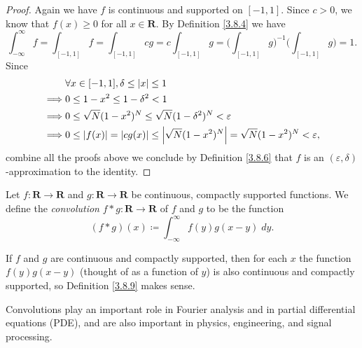 \begin{proof}
    Again we have \(f\) is continuous and supported on \([-1, 1]\).
    Since \(c > 0\), we know that \(f(x) \geq 0\) for all \(x \in \mathbf{R}\).
    By Definition \ref{3.8.4} we have
    \[
        \int_{-\infty}^\infty f = \int_{[-1, 1]} f = \int_{[-1, 1]} cg = c \int_{[-1, 1]} g = \bigg(\int_{[-1, 1]} g\bigg)^{-1} \bigg(\int_{[-1, 1]} g\bigg) = 1.
    \]
    Since
    \begin{align*}
                 & \forall x \in [-1, 1], \delta \leq \abs*{x} \leq 1                                                       \\
        \implies & 0 \leq 1 - x^2 \leq 1 - \delta^2 < 1                                                                     \\
        \implies & 0 \leq \sqrt{N} (1 - x^2)^N \leq \sqrt{N} (1 - \delta^2)^N < \varepsilon                                 \\
        \implies & 0 \leq \abs*{f(x)} = \abs*{cg(x)} \leq \abs*{\sqrt{N} (1 - x^2)^N} = \sqrt{N} (1 - x^2)^N < \varepsilon,
    \end{align*}
    combine all the proofs above we conclude by Definition \ref{3.8.6} that \(f\) is an \((\varepsilon, \delta)\)-approximation to the identity.
\end{proof}

\begin{definition}[Convolution]\label{3.8.9}
    Let \(f : \mathbf{R} \to \mathbf{R}\) and \(g : \mathbf{R} \to \mathbf{R}\) be continuous, compactly supported functions.
    We define the \emph{convolution} \(f * g : \mathbf{R} \to \mathbf{R}\) of \(f\) and \(g\) to be the function
    \[
        (f * g)(x) \coloneqq \int_{-\infty}^\infty f(y) g(x - y) \; dy.
    \]
\end{definition}

\begin{note}
    If \(f\) and \(g\) are continuous and compactly supported, then for each \(x\) the function \(f(y) g(x - y)\) (thought of as a function of \(y\)) is also continuous and compactly supported, so Definition \ref{3.8.9} makes sense.
\end{note}

\begin{remark}\label{3.8.10}
    Convolutions play an important role in Fourier analysis and in partial differential equations (PDE), and are also important in physics, engineering, and signal processing.
\end{remark}

